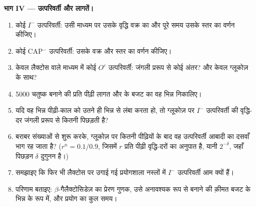 \begin{problem}
\medskip
\noindent\textbf{भाग IV --- उत्परिवर्ती और लागतें।}
\begin{enumerate}[resume]
  \item कोई $I^-$ उत्परिवर्ती: उसी माध्यम पर उसके वृद्धि वक्र का और
        पूरे समय उसके  स्तर का वर्णन कीजिए।
  \item कोई CAP$^-$ उत्परिवर्ती: उसके वक्र और  स्तर का वर्णन कीजिए।
  \item केवल लैक्टोस वाले माध्यम में कोई $O^c$ उत्परिवर्ती: जंगली
        प्ररूप से कोई अंतर? और केवल ग्लूकोज़ के साथ?
  \item \num{5000} चतुष्क बनाने की प्रति पीढ़ी  लागत और  के
        बजट का वह भिन्न निकालिए।
  \item यदि वह भिन्न पीढ़ी-काल को उतने ही भिन्न से लंबा करता हो, तो
        ग्लूकोज़ पर $I^-$ उत्परिवर्ती की वृद्धि-दर जंगली प्ररूप से
        कितनी पिछड़ती है?
  \item बराबर संख्याओं से शुरू करके, ग्लूकोज़ पर कितनी पीढ़ियों के बाद
        वह उत्परिवर्ती आबादी का दसवाँ भाग रह जाता है? ($r^n =
        0.1/0.9$, जिसमें $r$ प्रति पीढ़ी वृद्धि-दरों का अनुपात है,
        यानी $2^{-\delta}$, जहाँ पिछड़न $\delta$ दुगुनन है।)
  \item समझाइए कि फिर भी लैक्टोस पर उगाई गई प्रयोगशाला नस्लों में
        $I^-$ उत्परिवर्ती आम क्यों हैं।
  \item परिणाम बताइए: $\beta$-गैलैक्टोसिडेज़ का प्रेरण गुणक, उसे
        अनावश्यक रूप से बनाने की क़ीमत  बजट के भिन्न के रूप में, और
         प्रयोग का कुल समय।
\end{enumerate}
\end{problem}
